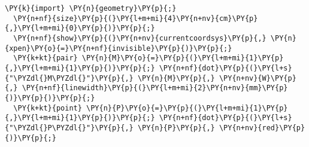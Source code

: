 \begin{Verbatim}[commandchars=\\\{\}]
  \PY{k}{import} \PY{n}{geometry}\PY{p}{;}
  \PY{n+nf}{size}\PY{p}{(}\PY{l+m+mi}{4}\PY{n+nv}{cm}\PY{p}{,}\PY{l+m+mi}{0}\PY{p}{)}\PY{p}{;}
  \PY{n+nf}{show}\PY{p}{(}\PY{n+nv}{currentcoordsys}\PY{p}{,} \PY{n}{xpen}\PY{o}{=}\PY{n+nf}{invisible}\PY{p}{)}\PY{p}{;}
  \PY{k+kt}{pair} \PY{n}{M}\PY{o}{=}\PY{p}{(}\PY{l+m+mi}{1}\PY{p}{,}\PY{l+m+mi}{1}\PY{p}{)}\PY{p}{;} \PY{n+nf}{dot}\PY{p}{(}\PY{l+s}{"\PYZdl{}M\PYZdl{}"}\PY{p}{,} \PY{n}{M}\PY{p}{,} \PY{n+nv}{W}\PY{p}{,} \PY{n+nf}{linewidth}\PY{p}{(}\PY{l+m+mi}{2}\PY{n+nv}{mm}\PY{p}{)}\PY{p}{)}\PY{p}{;}
  \PY{k+kt}{point} \PY{n}{P}\PY{o}{=}\PY{p}{(}\PY{l+m+mi}{1}\PY{p}{,}\PY{l+m+mi}{1}\PY{p}{)}\PY{p}{;} \PY{n+nf}{dot}\PY{p}{(}\PY{l+s}{"\PYZdl{}P\PYZdl{}"}\PY{p}{,} \PY{n}{P}\PY{p}{,} \PY{n+nv}{red}\PY{p}{)}\PY{p}{;}
\end{Verbatim}
